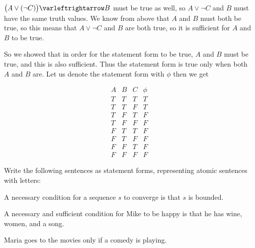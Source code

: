 \documentclass[10pt]{article}
\let\oto=\varleftrightarrow
\begin{document}
\begin{blankpp}
            \item $\bigl(A\lor(\neg C)\bigr)\oto B$ must be true as well, so $A\lor\neg C$ and $B$ must have the same truth values.
            We know from above that $A$ and $B$ must both be true, so this means that $A\lor\neg C$ and $B$ are both true, so it is sufficient for $A$ and $B$ to be true.
        \elist

        So we showed that in order for the statement form to be true, $A$ and $B$ must be true, and this is also sufficient.
        Thus the statement form is true only when both $A$ and $B$ are.
        Let us denote the statement form with $\phi$ then we get

        \vfill\break
        \[ \begin{array}{c|c|c|c}
            A & B & C & \phi \\
            \hline
            T & T & T & T \\
            T & T & F & T \\
            T & F & T & F \\
            T & F & F & F \\
            F & T & T & F \\
            F & T & F & F \\
            F & F & T & F \\
            F & F & F & F
        \end{array} \]

    \eenum

\end{blankpp}

\begin{exercise*}

    Write the following sentences as statement forms, representing atomic sentences with letters:
    \benum
        \item A necessary condition for a sequence $s$ to converge is that $s$ is bounded.
        \item A necessary and sufficient condition for Mike to be happy is that he has wine, women, and a song.
        \item Maria goes to the movies only if a comedy is playing.
    \eenum

\end{exercise*}
\end{document}
